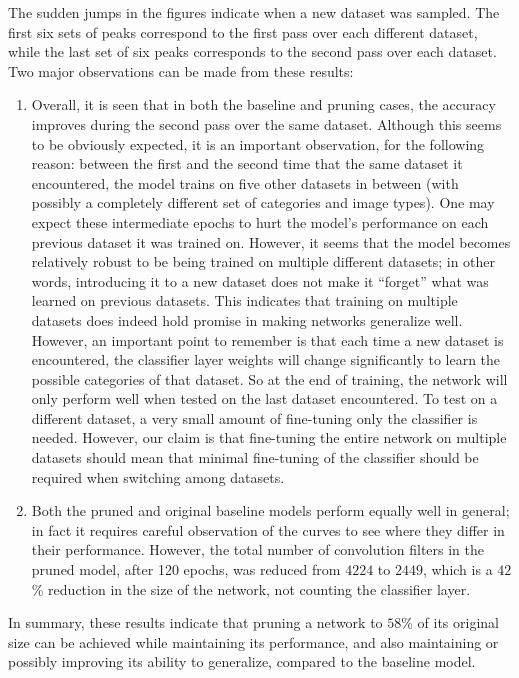 \documentclass{article}
\begin{document}
\begin{itemize}
	The sudden jumps in the figures indicate when a new dataset was sampled. The first six sets of peaks correspond to the first pass over each different dataset, while the last set of six peaks corresponds to the second pass over each dataset. Two major observations can be made from these results:
	
	\begin{enumerate}
		\item Overall, it is seen that in both the baseline and pruning cases, the accuracy improves during the second pass over the same dataset. Although this seems to be obviously expected, it is an important observation, for the following reason: between the first and the second time that the same dataset it encountered, the model trains on five other datasets in between (with possibly a completely different set of categories and image types). One may expect these intermediate epochs to hurt the model's performance on each previous dataset it was trained on. However, it seems that the model becomes relatively robust to be being trained on multiple different datasets; in other words, introducing it to a new dataset does not make it ``forget'' what was learned on previous datasets. This indicates that training on multiple datasets does indeed hold promise in making networks generalize well. However, an important point to remember is that each time a new dataset is encountered, the classifier layer weights will change significantly to learn the possible categories of that dataset. So at the end of training, the network will only perform well when tested on the last dataset encountered. To test on a different dataset, a very small amount of fine-tuning only the classifier is needed. However, our claim is that fine-tuning the entire network on multiple datasets should mean that minimal fine-tuning of the classifier should be required when switching among datasets.
		\item Both the pruned and original baseline models perform equally well in general; in fact it requires careful observation of the curves to see where they differ in their performance. However, the total number of convolution filters in the pruned model, after 120 epochs, was reduced from $4224$ to $2449$, which is a $42$\% reduction in the size of the network, not counting the classifier layer.
	\end{enumerate}
	In summary, these results indicate that pruning a network to $58$\% of its original size can be achieved while maintaining its performance, and also maintaining or possibly improving its ability to generalize, compared to the baseline model.
	
\end{itemize}
\end{document}
